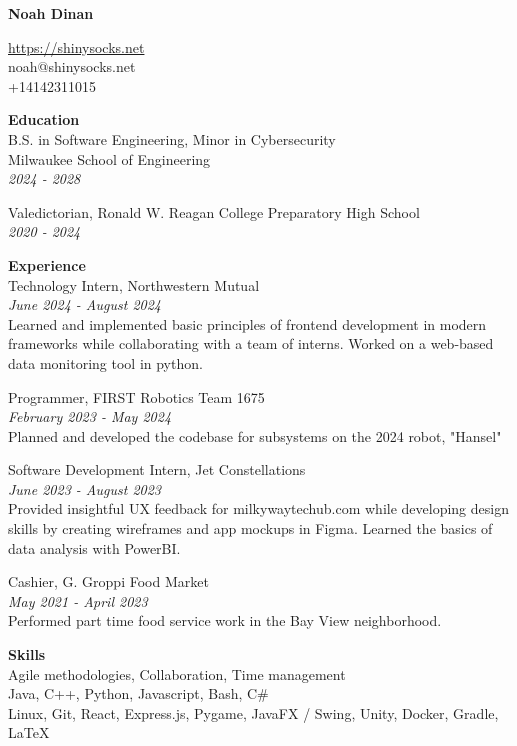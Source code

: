 \documentclass[10pt]{article}
\begin{document}
{\fontsize{19pt}{0pt}\selectfont \textbf{Noah Dinan}}

\href{https://shinysocks.net}{https://shinysocks.net}\\
noah@shinysocks.net\\
+14142311015

{\fontsize{11pt}{0pt}\selectfont \textbf{Education}}\\
B.S. in Software Engineering, Minor in Cybersecurity\\
Milwaukee School of Engineering\\
\textit{2024 - 2028}

Valedictorian, Ronald W. Reagan College Preparatory High School\\
\textit{2020 - 2024}

{\fontsize{11pt}{0pt}\selectfont \textbf{Experience}}\\
Technology Intern, Northwestern Mutual\\
\textit{June 2024 - August 2024}\\
Learned and implemented basic principles of frontend development in modern frameworks while
collaborating with a team of interns. Worked on a web-based data monitoring tool in python.

Programmer, FIRST Robotics Team 1675\\
\textit{February 2023 - May 2024}\\
Planned and developed the codebase for subsystems on the 2024 robot, "Hansel"

Software Development Intern, Jet Constellations\\
\textit{June 2023 - August 2023}\\
Provided insightful UX feedback for milkywaytechub.com while developing design skills by
creating wireframes and app mockups in Figma. Learned the basics of data analysis with PowerBI.

Cashier, G. Groppi Food Market\\
\textit{May 2021 - April 2023}\\
Performed part time food service work in the Bay View neighborhood.

{\fontsize{11pt}{0pt}\selectfont \textbf{Skills}}\\
Agile methodologies, Collaboration, Time management\\
Java, C++, Python, Javascript, Bash, C\#\\
Linux, Git, React, Express.js, Pygame, JavaFX / Swing, Unity, Docker, Gradle, LaTeX
\end{document}
